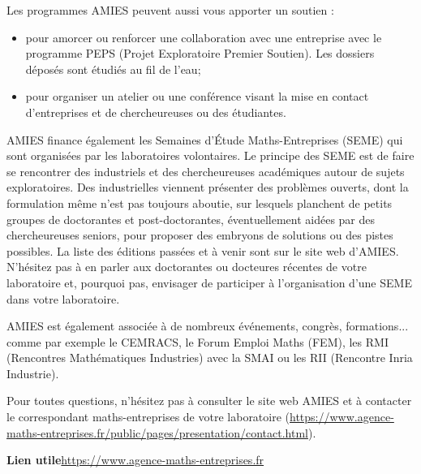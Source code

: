Les programmes AMIES peuvent aussi vous apporter un soutien :
\begin{itemize}
\item pour amorcer ou renforcer une collaboration avec une
  entreprise avec le programme PEPS (Projet Exploratoire Premier Soutien). Les dossiers d\'epos\'es sont \'etudi\'es
  au fil de l'eau;
\item   pour organiser un atelier ou une conf\'erence visant la
  mise en contact d'entreprises et de chercheur\mp euse\mp s ou des \'etudiant\mp e\mp s.
\end{itemize}

AMIES finance \'egalement  les Semaines d'\'Etude Maths-Entreprises (SEME) qui sont
organis\'ees par les laboratoires volontaires. 
Le principe des SEME est de faire se rencontrer des industriels et des chercheur\mp euse\mp s acad{\'e}miques 
autour de sujets exploratoires. Des industriel\mp les viennent pr{\'e}senter des probl{\`e}mes ouverts, 
dont la formulation m{\^e}me n'est pas toujours aboutie, 
sur lesquels planchent de petits groupes de doctorant\mp e\mp s et post-doctorant\mp e\mp s, 
{\'e}ventuellement aid{\'e}\mp e\mp s par des chercheur\mp euse\mp s seniors, pour proposer des embryons de solutions ou des pistes possibles.
La liste des {\'e}ditions pass{\'e}es et {\`a} venir sont sur le site web d'AMIES.
N'h\'esitez pas \`a en parler aux doctorant\mp e\mp s ou docteur\mp e\mp s r\'ecent\mp e\mp s de votre laboratoire et,
pourquoi pas, envisager de participer \`a l'organisation d'une SEME dans votre laboratoire. 

AMIES est {\'e}galement associ{\'e}e {\`a} de nombreux {\'e}v{\'e}nements, congr{\`e}s, formations... 
comme par exemple le CEMRACS, le Forum Emploi Maths (FEM), les RMI (Rencontres Math{\'e}matiques Industries) 
avec la SMAI ou les RII (Rencontre Inria Industrie).

Pour toutes questions,  n'h\'esitez pas  \`a consulter le site web AMIES 
et \`a  contacter le correspondant maths-entreprises de votre laboratoire (\url{https://www.agence-maths-entreprises.fr/public/pages/presentation/contact.html}).

\textbf{Lien utile\hspace{.5em}}\url{https://www.agence-maths-entreprises.fr}




